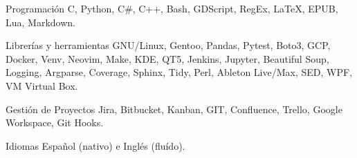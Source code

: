 

\begin{cvskills}

  \cvskill
    {Programación} %
    {C, Python, C\#, C++, Bash, GDScript, RegEx, LaTeX, EPUB, Lua, Markdown.} %

  \cvskill
    {Librerías y herramientas}
    {GNU/Linux, Gentoo, Pandas, Pytest, Boto3, GCP, Docker, Venv, Neovim, Make, KDE, QT5, Jenkins, Jupyter,}
  \cvskill
    {}
    {Beautiful Soup, Logging, Argparse, Coverage, Sphinx, Tidy, Perl, Ableton Live/Max, SED, WPF, VM Virtual Box.}

  \cvskill
    {Gestión de Proyectos}
    {Jira, Bitbucket, Kanban, GIT, Confluence, Trello, Google Workspace, Git Hooks.}

  \cvskill
    {Idiomas}
    {Español (nativo) e Inglés (fluído).}


\end{cvskills}
